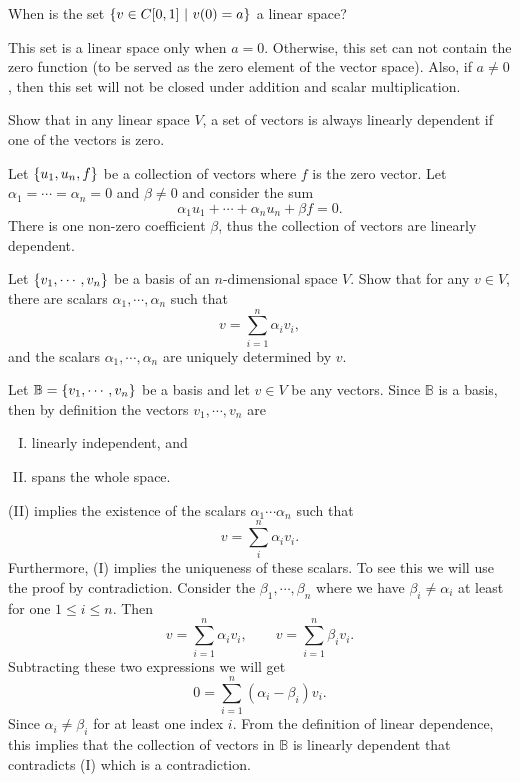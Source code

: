 \begin{problem}
	When is the set $ \{v \in C[0,1]\ |\ v(0) = a\} $ a linear space?
\end{problem}
\begin{solution}
	This set is a linear space only when $ a = 0 $. Otherwise, this set can not contain the zero function (to be served as the zero element of the vector space). Also, if $ a \neq 0 $, then this set will not be closed under addition and scalar multiplication.
\end{solution}

\begin{problem}
	Show that in any linear space $ V $, a set of vectors is always linearly dependent if one of the vectors is zero.
\end{problem}
\begin{solution}
	Let $ \{u_1,u_n,f\} $ be a collection of vectors where $ f $ is the zero vector. Let $ \alpha_1 = \cdots  = \alpha_n =0 $ and $ \beta \neq 0 $ and consider the sum
	\[ \alpha_1u_1 + \cdots + \alpha_n u_n + \beta f  = 0. \]
	There is one non-zero coefficient $ \beta $, thus the collection of vectors are linearly dependent.
\end{solution}

\begin{problem}
	Let $ \{v_1,\cdots,v_n\} $ be a basis of an $ n\text{-dimensional}$ space $ V $. Show that for any $ v\in V $, there are scalars $ \alpha_1,\cdots, \alpha_n $ such that 
	\[ v = \sum_{i=1}^{n} \alpha_i v_i, \]
	and the scalars $ \alpha_1,\cdots,\alpha_n $ are uniquely determined by $ v $.
\end{problem}
\begin{solution}
	Let $ \mathbb{B} = \{v_1,\cdots,v_n\} $ be a basis and let $ v \in V $ be any vectors. Since $ \mathbb{B} $ is a basis, then by definition the vectors $ v_1,\cdots,v_n $ are
	\begin{enumerate}[(I),noitemsep]
		\item linearly independent, and
		\item spans the whole space.
	\end{enumerate}
	(II) implies the existence of the scalars $ \alpha_1\cdots\alpha_n $ such that 
	\[ v = \sum_{i}^{n} \alpha_i v_i. \]
	Furthermore, (I) implies the uniqueness of these scalars. To see this we will use the proof by contradiction. Consider the $ \beta_1, \cdots, \beta_n $ where we have $ \beta_i \neq \alpha_i $ at least for one $ 1\leq i\leq n $. Then 
	\[ v = \sum_{i=1}^{n} \alpha_i v_i, \qquad v = \sum_{i=1}^{n} \beta_i v_i. \]
	Subtracting these two expressions we will get
	\[ 0 = \sum_{i=1}^{n} (\alpha_i - \beta_i) v_i. \]
	Since $ \alpha_i \neq \beta_i $ for at least one index $ i $. From the definition of linear dependence, this implies that the collection of vectors in $ \mathbb{B} $ is linearly dependent that contradicts (I) which is a contradiction.
\end{solution}

